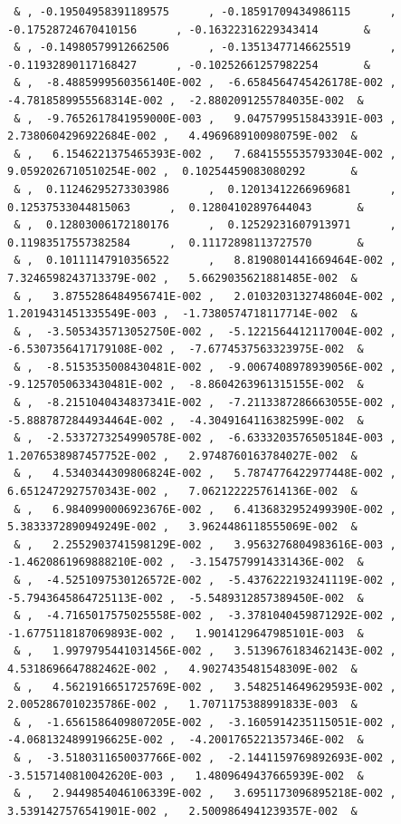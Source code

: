 \documentclass[a4paper,10pt]{report}
\begin{document}
{\begin{verbatim}
 & , -0.19504958391189575      , -0.18591709434986115      , -0.17528724670410156      , -0.16322316229343414       &
 & , -0.14980579912662506      , -0.13513477146625519      , -0.11932890117168427      , -0.10252661257982254       &
 & ,  -8.4885999560356140E-002 ,  -6.6584564745426178E-002 ,  -4.7818589955568314E-002 ,  -2.8802091255784035E-002  &
 & ,  -9.7652617841959000E-003 ,   9.0475799515843391E-003 ,   2.7380604296922684E-002 ,   4.4969689100980759E-002  &
 & ,   6.1546221375465393E-002 ,   7.6841555535793304E-002 ,   9.0592026710510254E-002 ,  0.10254459083080292       &
 & ,  0.11246295273303986      ,  0.12013412266969681      ,  0.12537533044815063      ,  0.12804102897644043       &
 & ,  0.12803006172180176      ,  0.12529231607913971      ,  0.11983517557382584      ,  0.11172898113727570       &
 & ,  0.10111147910356522      ,   8.8190801441669464E-002 ,   7.3246598243713379E-002 ,   5.6629035621881485E-002  &
 & ,   3.8755286484956741E-002 ,   2.0103203132748604E-002 ,   1.2019431451335549E-003 ,  -1.7380574718117714E-002  &
 & ,  -3.5053435713052750E-002 ,  -5.1221564412117004E-002 ,  -6.5307356417179108E-002 ,  -7.6774537563323975E-002  &
 & ,  -8.5153535008430481E-002 ,  -9.0067408978939056E-002 ,  -9.1257050633430481E-002 ,  -8.8604263961315155E-002  &
 & ,  -8.2151040434837341E-002 ,  -7.2113387286663055E-002 ,  -5.8887872844934464E-002 ,  -4.3049164116382599E-002  &
 & ,  -2.5337273254990578E-002 ,  -6.6333203576505184E-003 ,   1.2076538987457752E-002 ,   2.9748760163784027E-002  &
 & ,   4.5340344309806824E-002 ,   5.7874776422977448E-002 ,   6.6512472927570343E-002 ,   7.0621222257614136E-002  &
 & ,   6.9840990006923676E-002 ,   6.4136832952499390E-002 ,   5.3833372890949249E-002 ,   3.9624486118555069E-002  &
 & ,   2.2552903741598129E-002 ,   3.9563276804983616E-003 ,  -1.4620861969888210E-002 ,  -3.1547579914331436E-002  &
 & ,  -4.5251097530126572E-002 ,  -5.4376222193241119E-002 ,  -5.7943645864725113E-002 ,  -5.5489312857389450E-002  &
 & ,  -4.7165017575025558E-002 ,  -3.3781040459871292E-002 ,  -1.6775118187069893E-002 ,   1.9014129647985101E-003  &
 & ,   1.9979795441031456E-002 ,   3.5139676183462143E-002 ,   4.5318696647882462E-002 ,   4.9027435481548309E-002  &
 & ,   4.5621916651725769E-002 ,   3.5482514649629593E-002 ,   2.0052867010235786E-002 ,   1.7071175388991833E-003  &
 & ,  -1.6561586409807205E-002 ,  -3.1605914235115051E-002 ,  -4.0681324899196625E-002 ,  -4.2001765221357346E-002  &
 & ,  -3.5180311650037766E-002 ,  -2.1441159769892693E-002 ,  -3.5157140810042620E-003 ,   1.4809649437665939E-002  &
 & ,   2.9449854046106339E-002 ,   3.6951173096895218E-002 ,   3.5391427576541901E-002 ,   2.5009864941239357E-002  &

\end{verbatim}}
\end{document}
